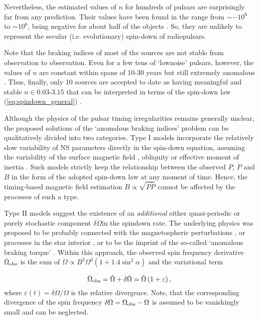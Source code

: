 \documentclass[fleqn,usenatbib]{mnras}
\begin{document}
Nevertheless, the estimated values of $n$ for hundreds of pulsars are
surprisingly far from any prediction. Their values have been found in
the range from $\sim -10^6$ to $\sim 10^6$, being negative for about half of the
objects \citep[e.g][]{hobbs04, bbk12, zhang12}. So, they are unlikely to represent the secular
(i.e. evolutionary) spin-down of radiopulsars.

Note that the braking indices of most of the sources are not
stable from observation to observation. Even for a few tens of `lownoise' pulsars, however, the values of $n$ are constant within spans of
10-30 years but still extremely anomalous \citep{bbk07}.
Thus, finally, only 10 sources are accepted to date as having meaningful and stable $n \in 0.03$-$3.15$ that can be interpreted in terms of
the spin-down law (\ref{eq:spindown_general}) \citep{archi16, marsh16}.

Although the physics of the pulsar timing irregularities remains
generally unclear, the proposed solutions of the `anomalous braking
indices' problem can be qualitatively divided into two categories. Type I models incorporate the relatively slow variability of NS
parameters directly in the spin-down equation, assuming the variability of the surface magnetic field \citep
{pons12, zhang12, ou16}, obliquity \citep{melatos2000, lyne13, arz15} or effective moment of inertia \citep{tsang13, hamil15,
hamil16}. Such models strictly keep
the relationship between the observed $P$, $\dot P$ and $B$ in the form of the
adopted spin-down law at any moment of time. Hence, the timing-based magnetic field estimation $B \propto \sqrt{P \dot P}$ cannot be affected by
the processes of such a type.

Type II models suggest the existence of an {\it additional} either
quasi-periodic or purely stochastic component $\delta \dot \Omega$in the spindown rate. The underlying physics was proposed to be probably
connected with the magnetospheric perturbations \citep{cheng87, kramer06, cont07, lyne10}, or processes in the star interior \citep{janssen06,
ml14}, or to be the imprint of the so-called `anomalous braking
torque' \citep{bbk07, bars10, bbk12}. Within this approach, the observed spin frequency
derivative $\dot \Omega_{\rm obs}$ is the sum of $\dot \Omega \propto B^2\Omega^3(1 + 1.4\sin^2\alpha)$ and the
variational term

\begin{equation}
	\dot \Omega_{\rm obs} = \dot \Omega + \delta \dot \Omega = \dot \Omega \left (1 + \varepsilon \right),
\end{equation}
where $\varepsilon(t) = \delta\dot \Omega/\dot \Omega$ is the relative divergence. Note, that the corresponding divergence of
the spin frequency $\delta \Omega = \Omega_{\rm obs} - \Omega$ is assumed to be vanishingly small and can be neglected.
\end{document}
